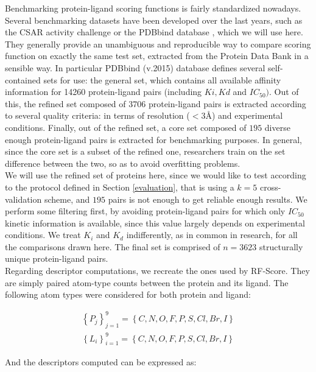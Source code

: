 \documentclass[10pt,a4paper,twoside]{book}
\begin{document}
Benchmarking protein-ligand scoring functions is fairly standardized nowadays. Several benchmarking datasets have been developed over the last years, such as the CSAR activity challenge \cite{Dunbar2013} or the PDBbind database \cite{Wang2004}, which we will use here. They generally provide an unambiguous and reproducible way to compare scoring function on exactly the same test set, extracted from the Protein Data Bank in a sensible way. In particular PDBbind (v.2015) database defines several self-contained sets for use: the general set, which contains all available affinity information for 14260 protein-ligand pairs (including $Ki, Kd$ and $IC_{50})$. Out of this, the refined set composed of 3706  protein-ligand pairs is extracted according to several quality criteria: in terms of resolution ($<3$\AA) and experimental conditions. Finally, out of the refined set, a core set composed of $195$ diverse enough protein-ligand pairs is extracted for benchmarking purposes. In general, since the core set is a subset of the refined one, researchers train on the set difference between the two, so as to avoid overfitting problems.\\

We will use the refined set of proteins here, since we would like to test according to the protocol defined in Section \ref{evaluation}, that is using a $k=5$ cross-validation scheme, and $195$ pairs is not enough to get reliable enough results. We perform some filtering first, by avoiding protein-ligand pairs for which only $IC_{50}$ kinetic information is available, since this value largely depends on experimental conditions. We treat $K_i$ and $K_d$ indifferently, as in common in research, for all the comparisons drawn here. The final set is comprised of $n=3623$ structurally unique protein-ligand pairs.\\

Regarding descriptor computations, we recreate the ones used by RF-Score. They are simply paired atom-type counts between the protein and its ligand. The following atom types were considered for both protein and ligand:

\begin{align*}
\left\lbrace P_j \right\rbrace_{j=1}^9 = \left\lbrace C, N, O, F, P, S, Cl, Br, I \right\rbrace \\
\left\lbrace L_i \right\rbrace_{i=1}^9 = \left\lbrace C, N, O, F, P, S, Cl, Br, I \right\rbrace
\end{align*}

And the descriptors computed can be expressed as:
\end{document}
